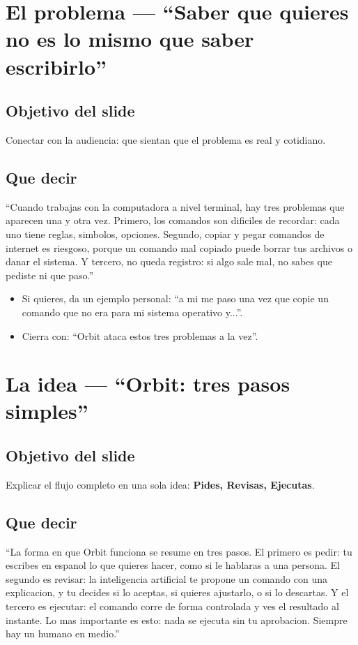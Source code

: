\documentclass[12pt,a4paper]{article}
\begin{document}
\section{El problema --- ``Saber que quieres no es lo mismo que saber escribirlo''}
\subsection{Objetivo del slide}
Conectar con la audiencia: que sientan que el problema es real y cotidiano.

\subsection{Que decir}
\begin{frasebox}
``Cuando trabajas con la computadora a nivel terminal, hay tres problemas que aparecen una y otra vez. Primero, los comandos son dificiles de recordar: cada uno tiene reglas, simbolos, opciones. Segundo, copiar y pegar comandos de internet es riesgoso, porque un comando mal copiado puede borrar tus archivos o danar el sistema. Y tercero, no queda registro: si algo sale mal, no sabes que pediste ni que paso.''
\end{frasebox}

\begin{itemize}
  \item Si quieres, da un ejemplo personal: ``a mi me paso una vez que copie un comando que no era para mi sistema operativo y...''.
  \item Cierra con: ``Orbit ataca estos tres problemas a la vez''.
\end{itemize}

\section{La idea --- ``Orbit: tres pasos simples''}
\subsection{Objetivo del slide}
Explicar el flujo completo en una sola idea: \textbf{Pides, Revisas, Ejecutas}.

\subsection{Que decir}
\begin{frasebox}
``La forma en que Orbit funciona se resume en tres pasos. El primero es pedir: tu escribes en espanol lo que quieres hacer, como si le hablaras a una persona. El segundo es revisar: la inteligencia artificial te propone un comando con una explicacion, y tu decides si lo aceptas, si quieres ajustarlo, o si lo descartas. Y el tercero es ejecutar: el comando corre de forma controlada y ves el resultado al instante. Lo mas importante es esto: nada se ejecuta sin tu aprobacion. Siempre hay un humano en medio.''
\end{frasebox}
\end{document}
